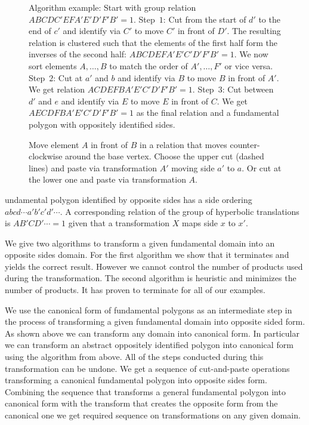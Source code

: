\documentclass[Thesis]{subfiles}
\begin{document}
\begin{figure}
\caption{Algorithm example: Start with group relation $ABCDC' EFA'E'D'F'B' = 1$. Step~$1$: Cut from the start of $d'$ to the end of $c'$ and identify via $C'$ to move $C'$ in front of $D'$. The resulting relation is clustered such that the elements of the first half form the inverses of the second half: $ABCDEFA'E'C'D'F'B' = 1$. We now sort elements $A,\ldots,B$ to match the order of $A',\ldots,F'$ or vice versa. Step~$2$: Cut at $a'$ and $b$ and identify via $B$ to move $B$ in front of $A'$. We get relation $ACDEFBA'E'C'D'F'B' = 1$. Step~$3$: Cut between $d'$ and $e$ and identify via $E$ to move $E$ in front of $C$. We get $AECDFBA'E'C'D'F'B' = 1$ as the final relation and a fundamental polygon with oppositely identified sides.}
\label{fig:opposite_algorithm}
\end{figure}

\begin{figure}
\centering
\resizebox{0.3\textwidth}{!} {

}
\caption{Move element $A$ in front of $B$ in a relation that moves counter-clockwise around the base vertex. Choose the upper cut (dashed lines) and paste via transformation $A'$ moving side $a'$ to $a$. Or cut at the lower one and paste via transformation $A$.}
\label{fig:cut-and-paste-motion}
\end{figure}

undamental polygon identified by opposite sides has a side ordering $abcd\cdots a'b'c'd'\cdots$. A corresponding relation of the group of hyperbolic translations is $AB'CD'\cdots=1$ given that a transformation $X$ maps side $x$ to $x'$.

We give two algorithms to transform a given fundamental domain into an opposite sides domain.
For the first algorithm we show that it terminates and yields the correct result. However we cannot control the number of products used during the transformation. The second algorithm is heuristic and minimizes the number of products. It has proven to terminate for all of our examples.

We use the canonical form of fundamental polygons as an intermediate step in the process of transforming a given fundamental domain into opposite sided form. As shown above we can transform any domain into canonical form. In particular we can transform an abstract oppositely identified polygon into canonical form using the algorithm from above. All of the steps conducted during this transformation can be undone. We get a sequence of cut-and-paste operations transforming a canonical fundamental polygon into opposite sides form. Combining the sequence that transforms a general fundamental polygon into canonical form with the transform that creates the opposite form from the canonical one we get required sequence on transformations on any given domain.
\end{document}
